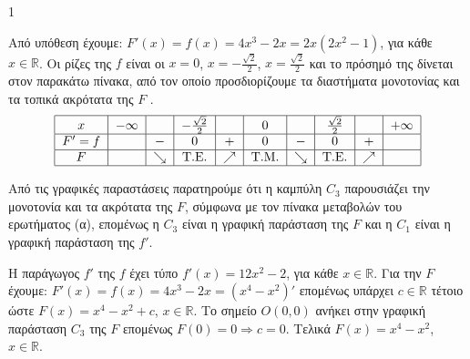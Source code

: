 \begin{ylh}{1}
    \item [Ύλη από εικόνα]
\end{ylh}
\begin{alist}
\item Από υπόθεση έχουμε: $F'(x) = f(x) = 4x^3 - 2x = 2x(2x^2 - 1)$, για κάθε $x \in \mathbb{R}$.
Οι ρίζες της $f$ είναι οι $x=0$, $x = -\frac{\sqrt{2}}{2}$, $x = \frac{\sqrt{2}}{2}$ και το πρόσημό της δίνεται στον παρακάτω πίνακα, από τον οποίο προσδιορίζουμε τα διαστήματα μονοτονίας και τα τοπικά ακρότατα της $F$ .
\[
\begin{tabular}{|c|c|c|c|c|c|c|c|c|c|}
\hline
$x$ & $-\infty$ & & $-\frac{\sqrt{2}}{2}$ & & $0$ & & $\frac{\sqrt{2}}{2}$ & & $+\infty$ \\
\hline
$F'=f$ & & $-$ & $0$ & $+$ & $0$ & $-$ & $0$ & $+$ & \\
\hline
$F$ & & $\searrow$ & T.E. & $\nearrow$ & T.M. & $\searrow$ & T.E. & $\nearrow$ & \\
\hline
\end{tabular}
\]
\item Από τις γραφικές παραστάσεις παρατηρούμε ότι η καμπύλη $C_3$ παρουσιάζει την μονοτονία και τα ακρότατα της $F$, σύμφωνα με τον πίνακα μεταβολών του ερωτήματος (α), επομένως η $C_3$ είναι η γραφική παράσταση της $F$ και η $C_1$ είναι η γραφική παράσταση της $f' .$
\item Η παράγωγος $f'$ της $f$ έχει τύπο $f'(x) = 12x^2 - 2$, για κάθε $x \in \mathbb{R}$.
Για την $F$ έχουμε: $F'(x) = f(x) = 4x^3 - 2x = (x^4 - x^2)'$ επομένως υπάρχει $c \in \mathbb{R}$ τέτοιο ώστε $F(x) = x^4 - x^2 + c$, $x \in \mathbb{R}$.
Το σημείο $O(0,0)$ ανήκει στην γραφική παράσταση $C_3$ της $F$ επομένως $F(0) = 0 \Rightarrow c = 0$.
Τελικά $F(x) = x^4 - x^2$, $x \in \mathbb{R}$.
\end{alist}